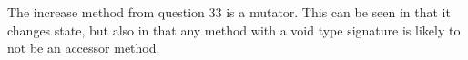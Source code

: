 The increase method from question 33 is a mutator. This can be seen in
that it changes state, but also in that any method with a void type
signature is likely to not be an accessor method.
